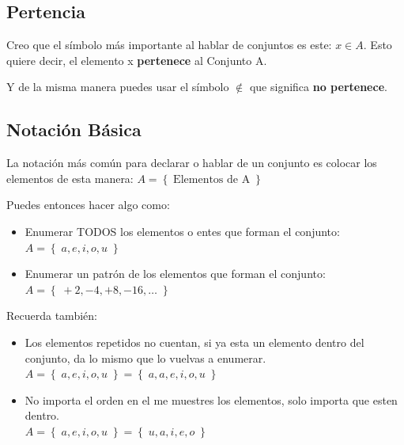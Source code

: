 \documentclass[12pt, fleqn]{report}                             %
\theoremstyle{break}                                            %
\newcommand{\Set}[1]            {\left\{ \; #1 \; \right\}}     %
\begin{document}
            \subsection{Pertencia}

            Creo que el símbolo más importante al hablar de conjuntos es este: $x \in A $.
            Esto quiere decir, el elemento x \textbf{pertenece} al Conjunto A.

            
            Y de la misma manera puedes usar el símbolo $\notin$ que significa
            \textbf{no pertenece}.


            \subsection{Notación Básica}

                La notación más común para declarar o hablar de un conjunto es colocar los elementos
                de esta manera: $ A = \Set{ \text{Elementos de A} }$

                Puedes entonces hacer algo como:
                \begin{itemize}
                    \item Enumerar TODOS los elementos o entes que forman el conjunto:
                    \\$A = \Set{a, e, i, o, u}$

                    \item Enumerar un patrón de los elementos que forman el conjunto:
                    \\$A = \Set{+2, -4, +8, -16, \dots}$
                \end{itemize}


                Recuerda también:
                \begin{itemize}
                    \item Los elementos repetidos no cuentan, si ya esta un elemento dentro del
                        conjunto, da lo mismo que lo vuelvas a enumerar.\\
                        $A = \Set{a, e, i, o, u} = \Set{a, a, e, i, o, u}$

                    \item No importa el orden en el me muestres los elementos,
                        solo importa que esten dentro.\\
                        $A = \Set{a, e, i, o, u} = \Set{u, a, i, e, o}$
                \end{itemize}
\end{document}

